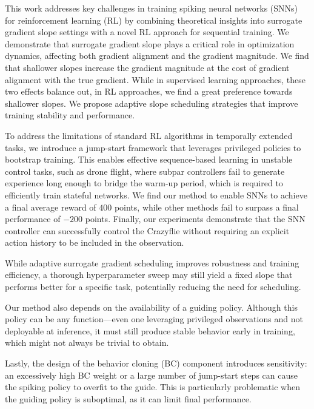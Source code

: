 This work addresses key challenges in training spiking neural networks (SNNs) for reinforcement learning (RL) by combining theoretical insights into surrogate gradient slope settings with a novel RL approach for sequential training. We demonstrate that surrogate gradient slope plays a critical role in optimization dynamics, affecting both gradient alignment and the gradient magnitude. We find that shallower slopes increase the gradient magnitude at the cost of gradient alignment with the true gradient. While in supervised learning approaches, these two effects balance out, in RL approaches, we find a great preference towards shallower slopes. We propose adaptive slope scheduling strategies that improve training stability and performance.

To address the limitations of standard RL algorithms in temporally extended tasks, we introduce a jump-start framework that leverages privileged policies to bootstrap training. This enables effective sequence-based learning in unstable control tasks, such as drone flight, where subpar controllers fail to generate experience long enough to bridge the warm-up period, which is required to efficiently train stateful networks. We find our method to enable SNNs to achieve a final average reward of $400$ points, while other methods fail to surpass a final performance of $-200$ points. Finally, our experiments demonstrate that the SNN controller can successfully control the Crazyflie without requiring an explicit action history to be included in the observation.

While adaptive surrogate gradient scheduling improves robustness and training efficiency, a thorough hyperparameter sweep may still yield a fixed slope that performs better for a specific task, potentially reducing the need for scheduling.

Our method also depends on the availability of a guiding policy. Although this policy can be any function—even one leveraging privileged observations and not deployable at inference, it must still produce stable behavior early in training, which might not always be trivial to obtain.

Lastly, the design of the behavior cloning (BC) component introduces sensitivity: an excessively high BC weight or a large number of jump-start steps can cause the spiking policy to overfit to the guide. This is particularly problematic when the guiding policy is suboptimal, as it can limit final performance.



